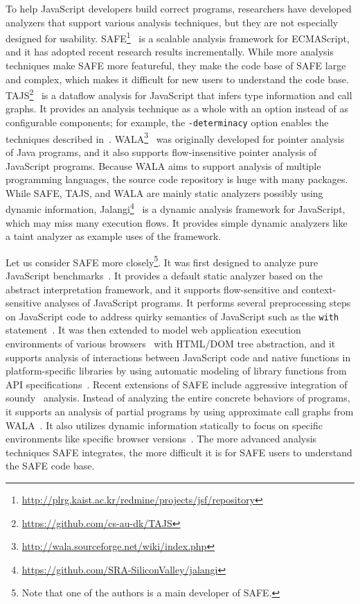 \documentclass[10pt, conference]{IEEEtran}
\newcommand{\mtt}[1]{\texttt{\small #1}}
\begin{document}
To help JavaScript developers build correct programs, researchers
have developed analyzers that support various analysis techniques,
but they are not especially designed for usability.
SAFE\footnote{\url{http://plrg.kaist.ac.kr/redmine/projects/jsf/repository}}~\cite{Lee12}
is a scalable analysis framework for ECMAScript, and it has adopted recent research results incrementally.
While more analysis techniques make SAFE more featureful,
they make the code base of SAFE large and complex, which makes it
difficult for new users to understand the code base.
TAJS\footnote{\url{https://github.com/cs-au-dk/TAJS}}~\cite{TAJSDETER}
is a dataflow analysis for JavaScript that infers type information and call graphs.
It provides an analysis technique as a whole with an option instead of as
configurable components;
for example, the \mtt{-determinacy} option enables the techniques described in~\cite{TAJSDETER}.
WALA\footnote{\url{http://wala.sourceforge.net/wiki/index.php}}~\cite{Schafer13}
was originally developed for pointer analysis of Java programs, and it
also supports flow-insensitive pointer analysis of JavaScript programs.
Because WALA aims to support analysis of multiple programming languages,
the source code repository is huge with many packages.
While SAFE, TAJS, and WALA are mainly static analyzers possibly using dynamic information,
Jalangi\footnote{\url{https://github.com/SRA-SiliconValley/jalangi}}~\cite{Sen13}
is a dynamic analysis framework for JavaScript, which may miss many execution flows.
It provides simple dynamic analyzers like a taint analyzer as example uses of the framework.


Let us consider SAFE more closely\footnote{
Note that one of the authors is a main developer of SAFE.}.  It was first designed to analyze pure
JavaScript benchmarks~\cite{Lee12}.  It provides a default static analyzer
based on the abstract interpretation framework, and it supports
flow-sensitive and context-sensitive analyses of JavaScript
programs.  It performs several preprocessing steps on JavaScript code to
address quirky semantics of JavaScript such as the \mtt{with}
statement~\cite{dls13}.
It was then extended to model web application execution environments
of various browsers~\cite{safewapp} with HTML/DOM tree abstraction,
and it supports analysis of interactions between JavaScript code
and native functions in platform-specific libraries by using automatic
modeling of library functions from API specifications~\cite{SAFEWAPI}.
Recent extensions of SAFE include aggressive integration of
soundy~\cite{soundy} analysis.  Instead of analyzing the entire concrete
behaviors of programs, it supports an analysis of partial
programs by using approximate call graphs from WALA~\cite{asewala}.
It also utilizes dynamic information statically to focus on specific
environments like specific browser versions~\cite{safehybrid}.
The more advanced analysis techniques SAFE integrates,
the more difficult it is for SAFE users to understand the SAFE code base.
\end{document}
